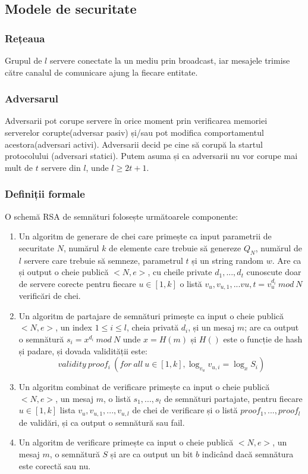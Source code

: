 \documentclass[12]{report}
\begin{document}
\subsection{Modele de securitate}
\subsubsection{Rețeaua}
Grupul de $l$ servere conectate la un mediu prin broadcast, iar mesajele trimise către canalul de comunicare ajung la fiecare entitate.
\subsubsection{Adversarul}
Adversarii pot corupe servere în orice moment prin verificarea memoriei serverelor corupte(adversar pasiv) și/sau pot modifica comportamentul acestora(adversari activi). Adversarii decid pe cine să corupă la startul protocolului (adversari statici). Putem asuma și ca adversarii nu vor corupe mai mult de $t$ servere din $l$, unde $l \geqslant 2t+1$.
\subsubsection{Definiții formale}
O schemă RSA de semnături folosește următoarele componente:
\begin{enumerate}
\item Un algoritm de generare de chei care primește ca input parametrii de securitate $N$, numărul $k$ de elemente care trebuie să genereze $Q_N$, numărul de $l$ servere care trebuie să semneze, parametrul $t$ și un string random $w$. Are ca și output o cheie publică $<N,e>$, cu cheile private $d_1,...,d_t$ cunoscute doar de servere corecte pentru fiecare $u \in [1,k]$ o listă $v_u,v_{u,1},...v{u,t}=v_{u}^{d_i} \ mod \ N$ verificări de chei. 
\item Un algoritm de partajare de semnături primește ca input o cheie publică $<N,e>$, un index $ 1\leqslant i \leqslant l$, cheia privată $d_i$, și un mesaj $m$; are ca output o semnătură $s_i = x^{d_i} \ mod \ N$ unde $x=H(m)$ și $H()$ este o funcție de hash și padare, și dovada validității este:
$$ validity \ proof_i \ (for \ all \ u \in [1,k], \log_{v_u} v_{u,i}=\log_x S_i)$$
\item Un algoritm combinat de verificare primește ca input o cheie publică $<N,e>$, un mesaj $m$, o listă $s_1,...,s_l$ de semnături partajate, pentru fiecare $u \in [1,k]$ lista $v_u,v_{u,1},...,v_{u,l}$ de chei de verificare și o listă $proof_1,...,proof_l$ de validări, și ca output o semnătură sau fail.
\item Un algoritm de verificare primește ca input o cheie publică $<N,e>$, un mesaj $m$, o semnătură $S$ și are ca output un bit $b$ indicând dacă semnătura este corectă sau nu.
\end{enumerate}
\end{document}
